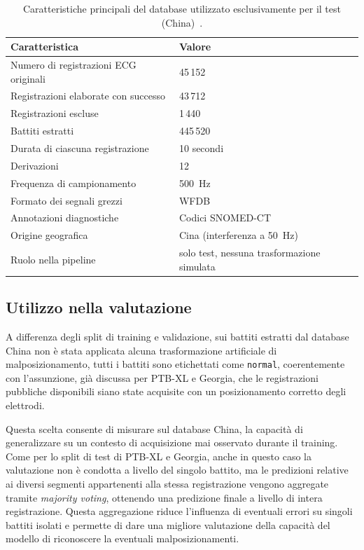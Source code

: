 \begin{table}[htbp]
	\centering
	\caption{Caratteristiche principali del database utilizzato esclusivamente per il test (China)~\cite{zheng2022ecgarrhythmia, zheng2020chapman}.}
	\label{tab:china_caratteristiche}
	\begin{tabular}{@{}ll@{}}
		\toprule
		\textbf{Caratteristica} & \textbf{Valore} \\
		\midrule
		Numero di registrazioni ECG originali & 45\,152 \\
		Registrazioni elaborate con successo & 43\,712 \\
		Registrazioni escluse & 1\,440 \\
		Battiti estratti & 445\,520 \\
		Durata di ciascuna registrazione & 10 secondi \\
		Derivazioni & 12 \\
		Frequenza di campionamento & 500~Hz \\
		Formato dei segnali grezzi & WFDB \\
		Annotazioni diagnostiche & Codici SNOMED-CT \\
		Origine geografica & Cina (interferenza a \SI{50}{Hz}) \\
		Ruolo nella pipeline & solo test, nessuna trasformazione simulata \\
		\bottomrule
	\end{tabular}
\end{table}

\subsection{Utilizzo nella valutazione}

A differenza degli split di training e validazione, sui battiti estratti dal database China non è stata applicata alcuna trasformazione artificiale di malposizionamento, tutti i battiti sono etichettati come \texttt{normal}, coerentemente con l'assunzione, già discussa per PTB-XL e Georgia, che le registrazioni pubbliche disponibili siano state acquisite con un posizionamento corretto degli elettrodi.

Questa scelta consente di misurare sul database China, la capacità di generalizzare su un contesto di acquisizione mai osservato durante il training. Come per lo split di test di PTB-XL e Georgia, anche in questo caso la valutazione non è condotta a livello del singolo battito, ma le predizioni relative ai diversi segmenti appartenenti alla stessa registrazione vengono aggregate tramite \emph{majority voting}, ottenendo una predizione finale a livello di intera registrazione. Questa aggregazione riduce l'influenza di eventuali errori su singoli battiti isolati e permette di dare una migliore valutazione della capacità del modello di riconoscere la eventuali malposizionamenti.